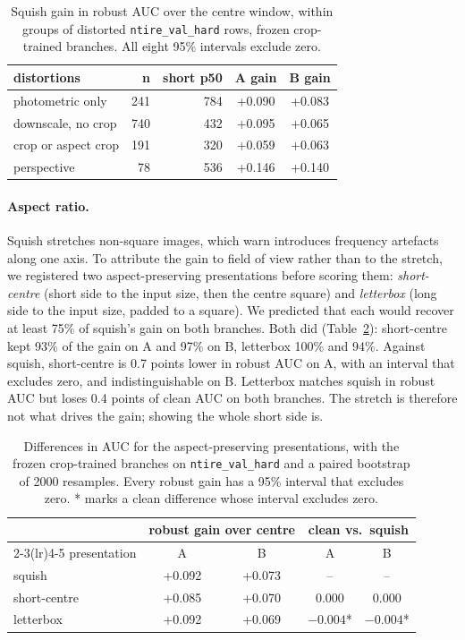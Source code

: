 \documentclass[letterpaper]{article} %
\begin{document}
\begin{table}[t]
\centering
\small
\setlength{\tabcolsep}{3pt}
\begin{tabular}{lrrcc}
\toprule
distortions & n & short p50 & A gain & B gain \\
\midrule
photometric only & 241 & 784 & +0.090 & +0.083 \\
downscale, no crop & 740 & 432 & +0.095 & +0.065 \\
crop or aspect crop & 191 & 320 & +0.059 & +0.063 \\
perspective & 78 & 536 & +0.146 & +0.140 \\
\bottomrule
\end{tabular}
\caption{Squish gain in robust AUC over the centre window, within groups of
distorted \texttt{ntire\_val\_hard} rows, frozen crop-trained branches. All
eight 95\% intervals exclude zero.}
\label{tab:groups}
\end{table}

\paragraph{Aspect ratio.} Squish stretches non-square images, which
\citet{grommelt2024fakeorjpeg} warn introduces frequency artefacts
along one axis. To attribute the gain to field of view
rather than to the stretch, we registered two aspect-preserving presentations
before scoring them: \emph{short-centre} (short side to the input size, then
the centre square) and \emph{letterbox} (long side to the input size, padded
to a square). We predicted that each would recover at least 75\% of squish's
gain on both branches. Both did (Table~\ref{tab:aspect}): short-centre kept
93\% of the gain on A and 97\% on B, letterbox 100\% and 94\%. Against squish,
short-centre is 0.7 points lower in robust AUC on A, with an interval that
excludes zero, and indistinguishable on B. Letterbox matches squish in robust
AUC but loses 0.4 points of clean AUC on both branches. The stretch is
therefore not what drives the gain; showing the whole short side is.

\begin{table}[t]
\centering
\small
\setlength{\tabcolsep}{3pt}
\begin{tabular}{lcccc}
\toprule
 & \multicolumn{2}{c}{robust gain over centre} & \multicolumn{2}{c}{clean vs.\ squish} \\
\cmidrule(lr){2-3}\cmidrule(lr){4-5}
presentation & A & B & A & B \\
\midrule
squish & +0.092 & +0.073 & -- & -- \\
short-centre & +0.085 & +0.070 & 0.000 & 0.000 \\
letterbox & +0.092 & +0.069 & $-0.004$* & $-0.004$* \\
\bottomrule
\end{tabular}
\caption{Differences in AUC for the aspect-preserving presentations, with the
frozen crop-trained branches on \texttt{ntire\_val\_hard} and a paired
bootstrap of 2000 resamples. Every robust gain
has a 95\% interval that excludes zero. * marks a clean difference whose
interval excludes zero.}
\label{tab:aspect}
\end{table}
\end{document}
